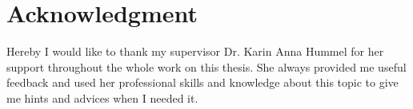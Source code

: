 \chapter*{Acknowledgment}

\ifx\manuscriptmode\undefined{}

Hereby I would like to thank my supervisor Dr. Karin Anna Hummel for her support throughout the whole work on this thesis. She always provided me useful feedback and used her professional skills and knowledge about this topic to give me hints and advices when I needed it. 

\fi
